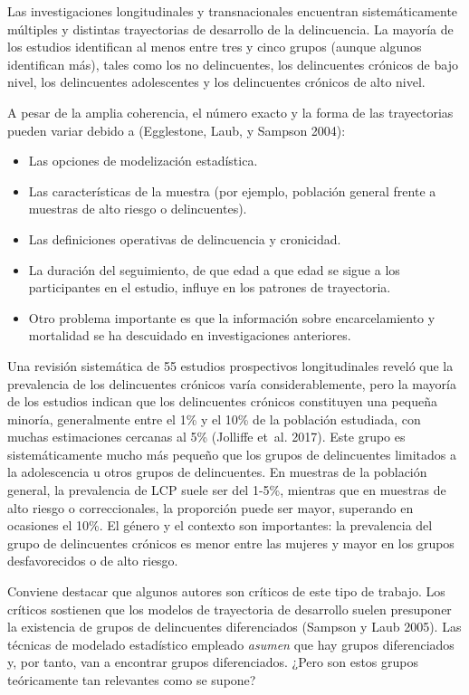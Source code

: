 \documentclass[
  spanish,
  letterpaper,
  DIV=11,
  numbers=noendperiod]{scrreprt}
\begin{document}
Las investigaciones longitudinales y transnacionales encuentran
sistemáticamente múltiples y distintas trayectorias de desarrollo de la
delincuencia. La mayoría de los estudios identifican al menos entre tres
y cinco grupos (aunque algunos identifican más), tales como los no
delincuentes, los delincuentes crónicos de bajo nivel, los delincuentes
adolescentes y los delincuentes crónicos de alto nivel.

A pesar de la amplia coherencia, el número exacto y la forma de las
trayectorias pueden variar debido a (Egglestone, Laub, y Sampson 2004):

\begin{itemize}
\item
  Las opciones de modelización estadística.
\item
  Las características de la muestra (por ejemplo, población general
  frente a muestras de alto riesgo o delincuentes).
\item
  Las definiciones operativas de delincuencia y cronicidad.
\item
  La duración del seguimiento, de que edad a que edad se sigue a los
  participantes en el estudio, influye en los patrones de trayectoria.
\item
  Otro problema importante es que la información sobre encarcelamiento y
  mortalidad se ha descuidado en investigaciones anteriores.
\end{itemize}

Una revisión sistemática de 55 estudios prospectivos longitudinales
reveló que la prevalencia de los delincuentes crónicos varía
considerablemente, pero la mayoría de los estudios indican que los
delincuentes crónicos constituyen una pequeña minoría, generalmente
entre el 1\% y el 10\% de la población estudiada, con muchas
estimaciones cercanas al 5\% (Jolliffe et~al. 2017). Este grupo es
sistemáticamente mucho más pequeño que los grupos de delincuentes
limitados a la adolescencia u otros grupos de delincuentes. En muestras
de la población general, la prevalencia de LCP suele ser del 1-5\%,
mientras que en muestras de alto riesgo o correccionales, la proporción
puede ser mayor, superando en ocasiones el 10\%. El género y el contexto
son importantes: la prevalencia del grupo de delincuentes crónicos es
menor entre las mujeres y mayor en los grupos desfavorecidos o de alto
riesgo.

Conviene destacar que algunos autores son críticos de este tipo de
trabajo. Los críticos sostienen que los modelos de trayectoria de
desarrollo suelen presuponer la existencia de grupos de delincuentes
diferenciados (Sampson y Laub 2005). Las técnicas de modelado
estadístico empleado \emph{asumen} que hay grupos diferenciados y, por
tanto, van a encontrar grupos diferenciados. ¿Pero son estos grupos
teóricamente tan relevantes como se supone?
\end{document}
